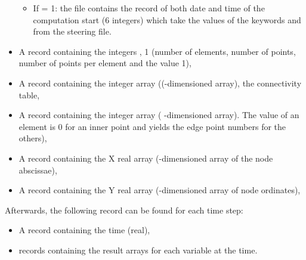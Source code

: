 \begin{itemize}
\begin{itemize}
\item If  = 1: the file contains the record of both date and time of
the computation start (6 integers) which take the values of the keywords
 and  from the
steering file.
\end{itemize}

\item A record containing the integers , 1
(number of elements, number of points, number of points per element and the
value 1),

\item A record containing the  integer array ((-dimensioned array), the connectivity table,

\item A record containing the  integer array (
-dimensioned array).
The value of an element is 0 for an inner point and yields the edge
point numbers for the others),

\item A record containing the X real array (-dimensioned array of
the node abscissae),

\item A record containing the Y real array (-dimensioned array of
node ordinates),
\end{itemize}

Afterwards, the following record can be found for each time step:

\begin{itemize}
\item A record containing the  time (real),

\item {} records containing the
result arrays for each variable at the  time.
\end{itemize}

